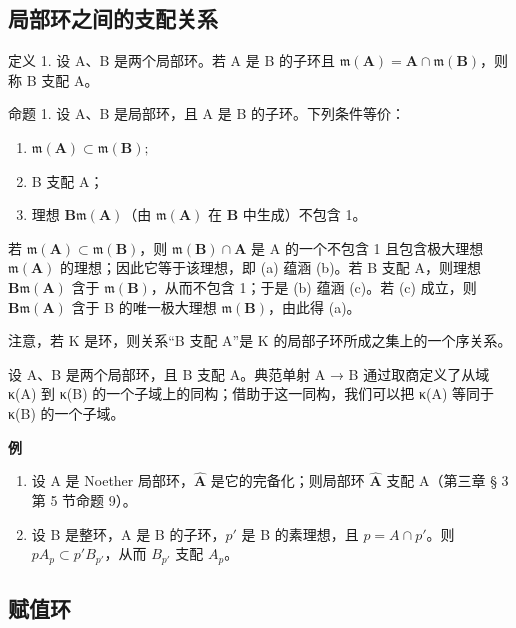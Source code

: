 \subsection{局部环之间的支配关系}

定义 1. 设 A、B 是两个局部环。若 A 是 B 的子环且 \(\mathfrak{m}(\mathbf{A}) = \mathbf{A} \cap \mathfrak{m}(\mathbf{B})\)，则称 B 支配 A。

命题 1. 设 A、B 是局部环，且 A 是 B 的子环。下列条件等价：

\begin{enumerate}
\def\labelenumi{(\alph{enumi})}
\item
  \(\mathfrak{m}(\mathbf{A}) \subset \mathfrak{m}(\mathbf{B});\)
\item
  B 支配 A；
\item
  理想 \(\mathbf{B}\mathfrak{m}(\mathbf{A})\)（由 \(\mathfrak{m}(\mathbf{A})\) 在 \(\mathbf{B}\) 中生成）不包含 1。
\end{enumerate}

若 \(\mathfrak{m}(\mathbf{A}) \subset \mathfrak{m}(\mathbf{B})\)，则 \(\mathfrak{m}(\mathbf{B}) \cap \mathbf{A}\) 是 A 的一个不包含 1 且包含极大理想 \(\mathfrak{m}(\mathbf{A})\) 的理想；因此它等于该理想，即 (a) 蕴涵 (b)。若 B 支配 A，则理想 \(\mathbf{B}\mathfrak{m}(\mathbf{A})\) 含于 \(\mathfrak{m}(\mathbf{B})\)，从而不包含 1；于是 (b) 蕴涵 (c)。若 (c) 成立，则 \(\mathbf{B}\mathfrak{m}(\mathbf{A})\) 含于 B 的唯一极大理想 \(\mathfrak{m}(\mathbf{B})\)，由此得 (a)。

注意，若 K 是环，则关系“B 支配 A”是 K 的局部子环所成之集上的一个序关系。

设 A、B 是两个局部环，且 B 支配 A。典范单射 A → B 通过取商定义了从域 κ(A) 到 κ(B) 的一个子域上的同构；借助于这一同构，我们可以把 κ(A) 等同于 κ(B) 的一个子域。

\textbf{例}\par

\begin{enumerate}
\def\labelenumi{(\arabic{enumi})}
\item
  设 A 是 Noether 局部环，\(\hat{\mathbf{A}}\) 是它的完备化；则局部环 \(\hat{\mathbf{A}}\) 支配 A（第三章 § 3 第 5 节命题 9）。
\item
  设 B 是整环，A 是 B 的子环，\(p'\) 是 B 的素理想，且 \(p = A \cap p'\)。则 \(pA_{p} \subset p'B_{p'}\)，从而 \(B_{p'}\) 支配 \(A_{p}\)。
\end{enumerate}

\subsection{赋值环}

